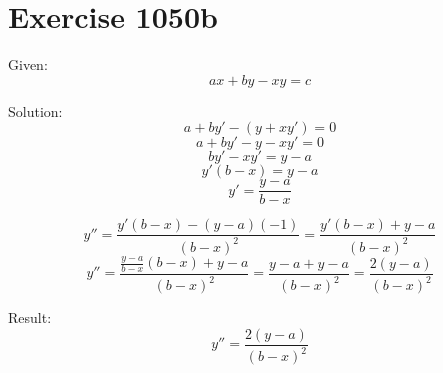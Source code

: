 \documentclass[a4paper, 10pt]{scrartcl}
\begin{document}
\section{Exercise 1050b}

Given:
\[
ax + by - xy = c
\]

Solution:
\[
a + by' - (y + xy') = 0
\]
\[
a + by' - y - xy' = 0
\]
\[
by' - xy' = y - a
\]
\[
y'(b - x) = y - a
\]
\[
y' = \frac{y - a}{b - x}
\]

\[
y'' = \frac{y'(b - x) - (y - a)(-1)}{(b - x)^{2}} = \frac{y'(b - x) + y - a}{(b - x)^{2}}
\]
\[
y'' = \frac{\frac{y - a}{b - x}(b - x) + y - a}{(b - x)^{2}} = \frac{y - a + y - a}{(b - x)^{2}} = \frac{2(y - a)}{(b - x)^{2}}
\]

Result:
\[
y'' = \frac{2(y - a)}{(b - x)^{2}}
\]
\end{document}
